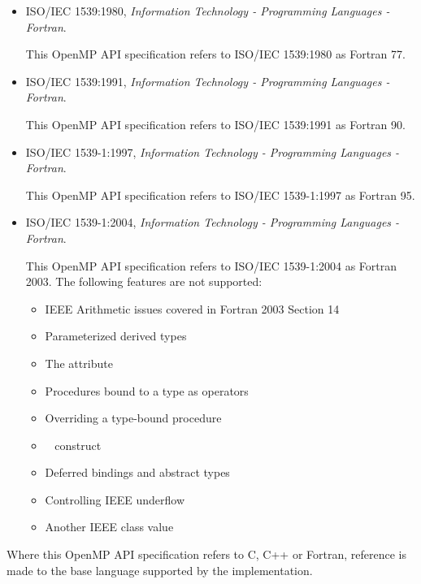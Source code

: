 \begin{itemize}
\item ISO/IEC 1539:1980, \textsl{Information Technology - Programming Languages - Fortran}.

This OpenMP API specification refers to ISO/IEC 1539:1980 as Fortran 77.

\item ISO/IEC 1539:1991, \textsl{Information Technology - Programming Languages - Fortran}.

This OpenMP API specification refers to ISO/IEC 1539:1991 as Fortran 90.

\item ISO/IEC 1539-1:1997, \textsl{Information Technology - Programming Languages - Fortran}.

This OpenMP API specification refers to ISO/IEC 1539-1:1997 as Fortran 95.

\item ISO/IEC 1539-1:2004, \textsl{Information Technology - Programming Languages - Fortran}.


This OpenMP API specification refers to ISO/IEC 1539-1:2004 as Fortran 2003. The 
following features are not supported:

\begin{itemize}
\item IEEE Arithmetic issues covered in Fortran 2003 Section 14

\item Parameterized derived types

\item The  attribute

\item Procedures bound to a type as operators

\item Overriding a type-bound procedure

\item {}~ construct

\item Deferred bindings and abstract types

\item Controlling IEEE underflow

\item Another IEEE class value 
\end{itemize}
\end{itemize}

Where this OpenMP API specification refers to C, C++ or Fortran, reference is made to 
the base language supported by the implementation.








